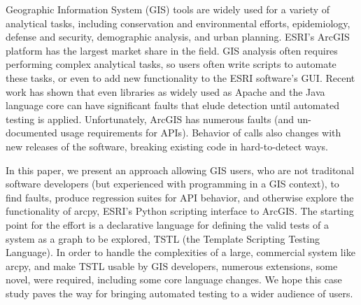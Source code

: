 Geographic Information System (GIS) tools are widely used for a variety of
analytical tasks, including conservation and environmental efforts,
epidemiology, defense and security, demographic analysis, and urban
planning.  ESRI's ArcGIS platform has the largest market share in the
field.  GIS analysis often requires performing complex analytical
tasks, so users often write scripts to automate these tasks, or even
to add new functionality to the ESRI software's GUI.  Recent work
has shown that even libraries as widely used as Apache and the Java
language core can have significant faults that elude detection until
automated testing is applied.  Unfortunately,  
ArcGIS has numerous faults (and un-documented usage requirements for
APIs).  Behavior of calls also changes with new releases of the
software, breaking existing code in hard-to-detect ways.

In this paper, we present an approach allowing GIS users, who are not
traditonal software developers (but experienced with programming in a
GIS context), to find faults, produce regression suites for API
behavior, and otherwise explore the functionality of arcpy, ESRI's
Python scripting interface to ArcGIS.  The starting point for the
effort is a declarative language for defining the valid tests of a
system as a graph to be explored, TSTL (the Template Scripting Testing
Language).  In order to handle the complexities of a large, commercial
system like arcpy, and make TSTL usable by GIS developers, numerous
extensions, some novel, were required, including some core language
changes.  We hope this case study paves the way for bringing automated
testing to a wider audience of users.
